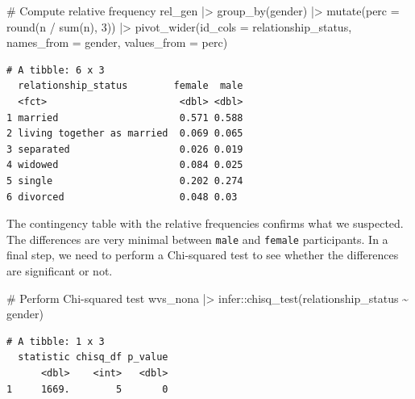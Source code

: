 \documentclass[
  letterpaper,
]{krantz}
\makeatletter
\newenvironment{Shaded}{\begin{snugshade}}{\end{snugshade}}
\newcommand{\AttributeTok}[1]{\textcolor[rgb]{0.40,0.45,0.13}{#1}}
\newcommand{\CommentTok}[1]{\textcolor[rgb]{0.37,0.37,0.37}{#1}}
\newcommand{\DecValTok}[1]{\textcolor[rgb]{0.68,0.00,0.00}{#1}}
\newcommand{\FunctionTok}[1]{\textcolor[rgb]{0.28,0.35,0.67}{#1}}
\newcommand{\NormalTok}[1]{\textcolor[rgb]{0.00,0.23,0.31}{#1}}
\newcommand{\OtherTok}[1]{\textcolor[rgb]{0.00,0.23,0.31}{#1}}
\newcommand{\SpecialCharTok}[1]{\textcolor[rgb]{0.37,0.37,0.37}{#1}}
\newenvironment{kframe}{%
\medskip{}
\setlength{\fboxsep}{.8em}
 \def\at@end@of@kframe{}%
 \ifinner\ifhmode%
  \def\at@end@of@kframe{\end{minipage}}%
  \begin{minipage}{\columnwidth}%
 \fi\fi%
 \def\FrameCommand##1{\hskip\@totalleftmargin \hskip-\fboxsep
 \colorbox{shadecolor}{##1}\hskip-\fboxsep
     \hskip-\linewidth \hskip-\@totalleftmargin \hskip\columnwidth}%
 \MakeFramed {\advance\hsize-\width
   \@totalleftmargin\z@ \linewidth\hsize
   \@setminipage}}%
 {\par\unskip\endMakeFramed%
 \at@end@of@kframe}
\renewenvironment{Shaded}{\begin{kframe}}{\end{kframe}}
\makeatother
\begin{document}
\begin{Shaded}
\begin{Highlighting}[]
\CommentTok{\# Compute relative frequency}
\NormalTok{rel\_gen }\SpecialCharTok{|\textgreater{}}
  \FunctionTok{group\_by}\NormalTok{(gender) }\SpecialCharTok{|\textgreater{}}
  \FunctionTok{mutate}\NormalTok{(}\AttributeTok{perc =} \FunctionTok{round}\NormalTok{(n }\SpecialCharTok{/} \FunctionTok{sum}\NormalTok{(n), }\DecValTok{3}\NormalTok{)) }\SpecialCharTok{|\textgreater{}}
  \FunctionTok{pivot\_wider}\NormalTok{(}\AttributeTok{id\_cols =}\NormalTok{ relationship\_status,}
              \AttributeTok{names\_from =}\NormalTok{ gender,}
              \AttributeTok{values\_from =}\NormalTok{ perc)}
\end{Highlighting}
\end{Shaded}

\begin{verbatim}
# A tibble: 6 x 3
  relationship_status        female  male
  <fct>                       <dbl> <dbl>
1 married                     0.571 0.588
2 living together as married  0.069 0.065
3 separated                   0.026 0.019
4 widowed                     0.084 0.025
5 single                      0.202 0.274
6 divorced                    0.048 0.03 
\end{verbatim}

The contingency table with the relative frequencies confirms what we
suspected. The differences are very minimal between \texttt{male} and
\texttt{female} participants. In a final step, we need to perform a
Chi-squared test to see whether the differences are significant or not.

\begin{Shaded}
\begin{Highlighting}[]
\CommentTok{\# Perform Chi{-}squared test}
\NormalTok{wvs\_nona }\SpecialCharTok{|\textgreater{}}\NormalTok{ infer}\SpecialCharTok{::}\FunctionTok{chisq\_test}\NormalTok{(relationship\_status }\SpecialCharTok{\textasciitilde{}}\NormalTok{ gender)}
\end{Highlighting}
\end{Shaded}

\begin{verbatim}
# A tibble: 1 x 3
  statistic chisq_df p_value
      <dbl>    <int>   <dbl>
1     1669.        5       0
\end{verbatim}

\begin{Shaded}
\end{Shaded}
\end{document}
